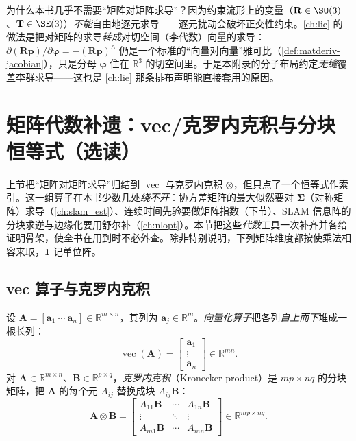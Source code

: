 \begin{insight}[与李群求导的关系]
为什么本书几乎不需要“矩阵对矩阵求导”？因为约束流形上的变量（$\mathbf{R}\in\SO(3)$、$\mathbf{T}\in\SE(3)$）\emph{不能}自由地逐元求导——逐元扰动会破坏正交性约束。\cref{ch:lie} 的做法是把对矩阵的求导\emph{转成}对切空间（李代数）向量的求导：$\partial(\mathbf{R}\mathbf{p})/\partial\boldsymbol{\varphi}=-(\mathbf{R}\mathbf{p})^\wedge$ 仍是一个标准的“向量对向量”雅可比（\cref{def:matderiv-jacobian}），只是分母 $\boldsymbol{\varphi}$ 住在 $\mathbb{R}^3$ 的切空间里。于是本附录的分子布局约定\emph{无缝}覆盖李群求导——这也是 \cref{ch:lie} 那条排布声明能直接套用的原因。
\end{insight}

\section{矩阵代数补遗：vec/克罗内克积与分块恒等式（选读）}
\label{sec:matderiv-algebra}

上节把“矩阵对矩阵求导”归结到 $\operatorname{vec}$ 与克罗内克积 $\otimes$，但只点了一个恒等式作索引。这一组算子在本书少数几处\emph{绕不开}：协方差矩阵的最大似然要对 $\boldsymbol{\Sigma}$（对称矩阵）求导（\cref{ch:slam_est}）、连续时间先验要做矩阵指数（下节）、SLAM 信息阵的分块求逆与边缘化要用舒尔补（\cref{ch:nlopt}）。本节把这些\emph{代数}工具一次补齐并各给证明骨架，使全书在用到时不必外查。除非特别说明，下列矩阵维度都按使乘法相容来取，$\mathbf{1}$ 记单位阵。

\subsection{vec 算子与克罗内克积}
\label{sec:matderiv-vec-kron}

\begin{definition}\label{def:matderiv-vec-kron}
设 $\mathbf{A}=[\mathbf{a}_1\ \cdots\ \mathbf{a}_n]\in\mathbb{R}^{m\times n}$，其列为 $\mathbf{a}_j\in\mathbb{R}^m$。\emph{向量化算子}把各列\emph{自上而下}堆成一根长列：
\begin{equation}
  \operatorname{vec}(\mathbf{A})=\begin{bmatrix}\mathbf{a}_1\\\vdots\\\mathbf{a}_n\end{bmatrix}\in\mathbb{R}^{mn}.
  \label{eq:matderiv-vec}
\end{equation}
对 $\mathbf{A}\in\mathbb{R}^{m\times n}$、$\mathbf{B}\in\mathbb{R}^{p\times q}$，\emph{克罗内克积}（Kronecker product）是 $mp\times nq$ 的分块矩阵，把 $\mathbf{A}$ 的每个元 $A_{ij}$ 替换成块 $A_{ij}\mathbf{B}$：
\begin{equation}
  \mathbf{A}\otimes\mathbf{B}=\begin{bmatrix}
    A_{11}\mathbf{B}&\cdots&A_{1n}\mathbf{B}\\
    \vdots&\ddots&\vdots\\
    A_{m1}\mathbf{B}&\cdots&A_{mn}\mathbf{B}
  \end{bmatrix}\in\mathbb{R}^{mp\times nq}.
  \label{eq:matderiv-kron}
\end{equation}
\end{definition}

